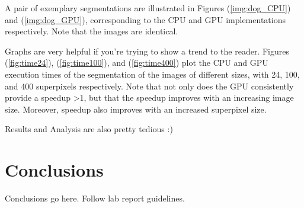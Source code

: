 \documentclass[CMPE]{KGCOEReport}
\begin{document}
A pair of exemplary segmentations are illustrated in Figures (\ref{img:dog_CPU}) and (\ref{img:dog_GPU}), corresponding to the CPU and GPU implementations respectively. Note that the images are identical.


Graphs are very helpful if you're trying to show a trend to the reader. Figures (\ref{fig:time24}), (\ref{fig:time100}), and (\ref{fig:time400}) plot the CPU and GPU execution times of the segmentation of the images of different sizes, with 24, 100, and 400 superpixels respectively. Note that not only does the GPU consistently provide a speedup >1, but that the speedup improves with an increasing image size. Moreover, speedup also improves with an increased superpixel size.


Results and Analysis are also pretty tedious :)\\


\section{Conclusions}
Conclusions go here. Follow lab report guidelines.\\


\end{document}
